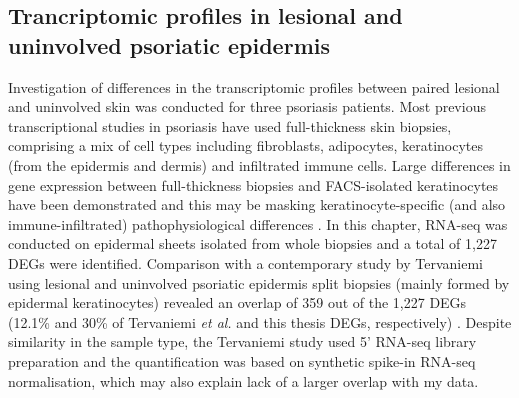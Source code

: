 \subsection{Trancriptomic profiles in lesional and uninvolved psoriatic epidermis}
Investigation of differences in the transcriptomic profiles between paired lesional and uninvolved skin was conducted for three psoriasis patients. Most previous transcriptional studies in psoriasis have used full-thickness skin biopsies, comprising a mix of cell types including fibroblasts, adipocytes, keratinocytes (from the epidermis and dermis) and infiltrated immune cells. Large differences in gene expression between full-thickness biopsies and FACS-isolated keratinocytes have been demonstrated and this may be masking keratinocyte-specific (and also immune-infiltrated) pathophysiological differences \parencite{Ahn2016}. In this chapter, RNA-seq was conducted on epidermal sheets isolated from whole biopsies and a total of 1,227 DEGs were identified. Comparison with a contemporary study by Tervaniemi using lesional and uninvolved psoriatic epidermis split biopsies (mainly formed by epidermal keratinocytes) revealed an overlap of 359 out of the 1,227 DEGs (12.1\% and 30\% of Tervaniemi \textit{et al.} and this thesis DEGs, respectively) \parencite{Tervaniemi2016}. Despite similarity in the sample type, the Tervaniemi study used 5' RNA-seq library preparation and the quantification was based on synthetic spike-in RNA-seq normalisation, which may also explain lack of a larger overlap with my data.






